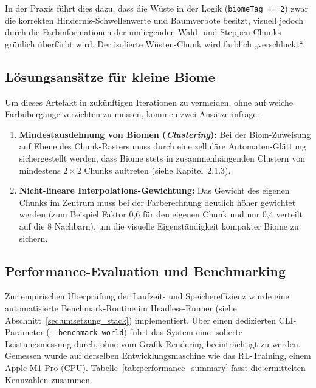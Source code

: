 \documentclass[
  a4paper,
  11pt,
  twoside,
  BCOR=8mm,           %
  headings=big,
  numbers=noenddot,
  listof=totoc,       %
  captions=tableheading,
]{scrreprt}
\begin{document}
In der Praxis führt dies dazu, dass die Wüste in der Logik (\texttt{biomeTag == 2}) zwar die korrekten Hindernis-Schwellenwerte und Baumverbote besitzt, visuell jedoch durch die Farbinformationen der umliegenden Wald- und Steppen-Chunks grünlich überfärbt wird. Der isolierte Wüsten-Chunk wird farblich „verschluckt“. 

\subsection{Lösungsansätze für kleine Biome}
Um dieses Artefakt in zukünftigen Iterationen zu vermeiden, ohne auf weiche Farbübergänge verzichten zu müssen, kommen zwei Ansätze infrage:

\begin{enumerate}
    \item \textbf{Mindestausdehnung von Biomen (\textit{Clustering}):} Bei der Biom-Zuweisung auf Ebene des Chunk-Rasters muss durch eine zelluläre Automaten-Glättung sichergestellt werden, dass Biome stets in zusammenhängenden Clustern von mindestens $2 \times 2$ Chunks auftreten (siehe Kapitel~2.1.3).
    \item \textbf{Nicht-lineare Interpolations-Gewichtung:} Das Gewicht des eigenen Chunks im Zentrum muss bei der Farberechnung deutlich höher gewichtet werden (zum Beispiel Faktor 0,6 für den eigenen Chunk und nur 0,4 verteilt auf die 8 Nachbarn), um die visuelle Eigenständigkeit kompakter Biome zu sichern.
\end{enumerate}

\subsection{Performance-Evaluation und Benchmarking}
\label{sec:ergebnisse_performance}

Zur empirischen Überprüfung der Laufzeit- und Speichereffizienz wurde eine automatisierte Benchmark-Routine im Headless-Runner (siehe Abschnitt~\ref{sec:umsetzung_stack}) implementiert. Über einen dedizierten CLI-Parameter (\texttt{-{}-benchmark-world}) führt das System eine isolierte Leistungsmessung durch, ohne vom Grafik-Rendering beeinträchtigt zu werden. Gemessen wurde auf derselben Entwicklungsmaschine wie das RL-Training, einem Apple M1 Pro (CPU). Tabelle~\ref{tab:performance_summary} fasst die ermittelten Kennzahlen zusammen.
\end{document}
